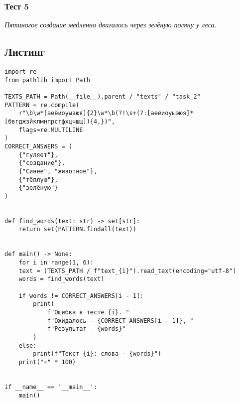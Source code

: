\subsubsection*{Тест 5}
\textit{Пятиногое создание медленно двигалось через зелёную поляну у леса.}

\subsection*{Листинг}
\begin{verbatim}
import re
from pathlib import Path

TEXTS_PATH = Path(__file__).parent / "texts" / "task_2"
PATTERN = re.compile(
    r"\b\w*[аеёиоуыэюя]{2}\w*\b(?!\s+(?:[аеёиоуыэюя]*[бвгджзйклмнпрстфхцчшщ]){4,})",
    flags=re.MULTILINE
)
CORRECT_ANSWERS = (
    {"гуляет"},
    {"создание"},
    {"Синее", "животное"},
    {"тёплую"},
    {"зелёную"}
)


def find_words(text: str) -> set[str]:
    return set(PATTERN.findall(text))


def main() -> None:
    for i in range(1, 6):
    text = (TEXTS_PATH / f"text_{i}").read_text(encoding="utf-8")
    words = find_words(text)

    if words != CORRECT_ANSWERS[i - 1]:
        print(
            f"Ошибка в тесте {i}. "
            f"Ожидалось - {CORRECT_ANSWERS[i - 1]}, "
            f"Результат - {words}"
        )
    else:
        print(f"Текст {i}: слова - {words}")
    print("=" * 100)


if __name__ == '__main__':
    main()
\end{verbatim}

